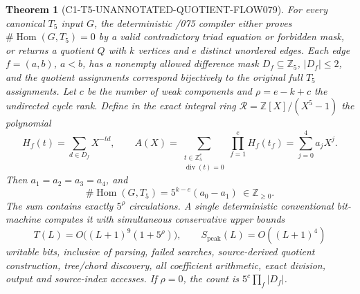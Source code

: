 \documentclass[11pt]{article}
\newtheorem{theorem}{Theorem}
\begin{document}
\begin{theorem}[C1-T5-UNANNOTATED-QUOTIENT-FLOW079]
For every canonical $T_5$ input $G$, the deterministic /075 compiler
either proves $\#\operatorname{Hom}(G,T_5)=0$ by a valid contradictory
triad equation or forbidden mask, or returns a quotient $Q$ with $k$
vertices and $e$ distinct unordered edges. Each edge
$f=(a,b)$, $a<b$, has a nonempty allowed difference mask
$D_f\subseteq\mathbb Z_5$, $|D_f|\le2$,
and the quotient assignments correspond \emph{bijectively} to
the original full $T_5$ assignments. Let $c$ be the number of weak
components and $\rho=e-k+c$ the undirected cycle rank.
Define in the exact integral ring
$\mathcal R=\mathbb Z[X]/(X^5-1)$ the polynomial
\[
 H_f(t)=\sum_{d\in D_f}X^{-td},\qquad
 A(X)=\sum_{\substack{t\in\mathbb Z_5^e\\
           \operatorname{div}(t)=0}}\prod_{f=1}^e H_f(t_f)
       =\sum_{j=0}^4 a_jX^j.
\]
Then $a_1=a_2=a_3=a_4$, and
\[
 \boxed{\#\operatorname{Hom}(G,T_5)
       =5^{k-e}(a_0-a_1)\ \in\mathbb Z_{\ge0}.}
\]
The sum contains exactly $5^\rho$ circulations.
A \emph{single} deterministic conventional bit-machine computes it
with simultaneous conservative upper bounds
\[
 T(L)=O\big((L+1)^9(1+5^\rho)\big),\qquad
 S_{\mathrm{peak}}(L)=O((L+1)^4)
\]
writable bits, inclusive of parsing, failed searches, source-derived
quotient construction, tree/chord discovery, all coefficient arithmetic,
exact division, output and source-index accesses. If $\rho=0$,
the count is $5^c\prod_{f}|D_f|$.
\end{theorem}
\end{document}

